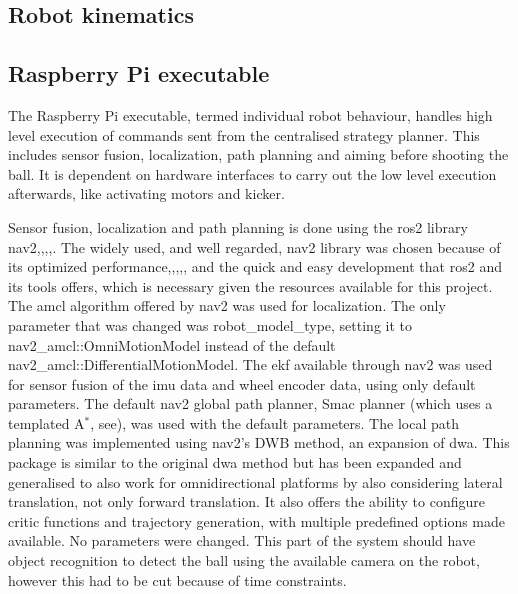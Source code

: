 \subsection{Robot kinematics}


\subsection{Raspberry Pi executable}
The Raspberry Pi executable, termed individual robot behaviour, handles high level execution of commands sent from the centralised strategy planner. This includes sensor fusion, localization, path planning and aiming before shooting the ball. It is dependent on hardware interfaces to carry out the low level execution afterwards, like activating motors and kicker.

Sensor fusion, localization and path planning is done using the \ac{ros2} library nav2\:\cite{macenski_desks_2023},\cite{macenski_marathon_2020},\cite{merzlyakov_comparison_2021},\cite{macenski_regulated_2023},\cite{macenski_open-source_2024}.
The widely used, and well regarded, nav2 library was chosen because of its optimized performance\:\cite{macenski_desks_2023},\cite{macenski_open-source_2024},\cite{macenski_regulated_2023},\cite{merzlyakov_comparison_2021},\cite{macenski_marathon_2020}, and the quick and easy development that \ac{ros2} and its tools offers, which is necessary given the resources available for this project\:\cite{macenski_robot_2022}.
The \ac{amcl} algorithm offered by nav2 was used for localization\:\cite{macenski_desks_2023}. The only parameter that was changed was robot\_model\_type, setting it to nav2\_amcl::OmniMotionModel instead of the default nav2\_amcl::DifferentialMotionModel.
The \ac{ekf} available through nav2 was used for sensor fusion of the \ac{imu} data and wheel encoder data, using only default parameters.
The default nav2 global path planner, Smac planner (which uses a templated A$^*$, see\:\cite{macenski_open-source_2024}), was used with the default parameters.
The local path planning was implemented using nav2's DWB method, an expansion of \ac{dwa}\:\cite{macenski_desks_2023}. This package is similar to the original \ac{dwa} method but has been expanded and generalised to also work for omnidirectional platforms by also considering lateral translation, not only forward translation\:\cite{macenski_desks_2023}. It also offers the ability to configure critic functions and trajectory generation, with multiple predefined options made available\:\cite{macenski_desks_2023}. No parameters were changed.
This part of the system should have object recognition to detect the ball using the available camera on the robot, however this had to be cut because of time constraints.


